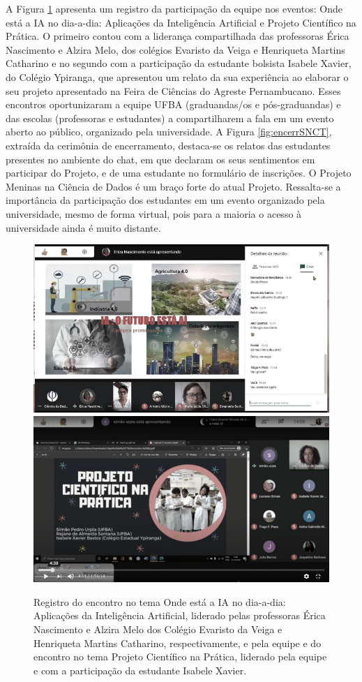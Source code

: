 \documentclass[
]{book}
\begin{document}
A Figura \ref{fig:ondeestaAI} apresenta um registro da participação da equipe nos eventos: Onde está a IA no dia-a-dia: Aplicações da Inteligência Artificial e Projeto Científico na Prática. O primeiro contou com a liderança compartilhada das professoras Érica Nascimento e Alzira Melo, dos colégios Evaristo da Veiga e Henriqueta Martins Catharino e no segundo com a participação da estudante bolsista Isabele Xavier, do Colégio Ypiranga, que apresentou um relato da sua experiência ao elaborar o seu projeto apresentado na Feira de Ciências do Agreste Pernambucano. Esses encontros oportunizaram a equipe UFBA (graduandas/os e pós-graduandas) e das escolas (professoras e estudantes) a compartilharem a fala em um evento aberto ao público, organizado pela universidade. A Figura \ref{fig:encerrSNCT}, extraída da cerimônia de encerramento, destaca-se os relatos das estudantes presentes no ambiente do chat, em que declaram os seus sentimentos em participar do Projeto, e de uma estudante no formulário de inscrições. O Projeto Meninas na Ciência de Dados é um braço forte do atual Projeto. Ressalta-se a importância da participação dos estudantes em um evento organizado pela universidade, mesmo de forma virtual, pois para a maioria o acesso à universidade ainda é muito distante.

\begin{figure}

{\centering \includegraphics[width=0.49\linewidth,height=0.2\textheight]{images/image98} \includegraphics[width=0.49\linewidth,height=0.2\textheight]{images/image99} 

}

\caption{Registro do encontro no tema Onde está a IA no dia-a-dia: Aplicações da Inteligência Artificial, liderado pelas professoras Érica Nascimento e Alzira Melo dos Colégio Evaristo da Veiga e Henriqueta Martins Catharino, respectivamente, e pela equipe e do encontro no tema Projeto Científico na Prática, liderado pela equipe e com a participação da estudante Isabele Xavier.}\label{fig:ondeestaAI}
\end{figure}
\end{document}
